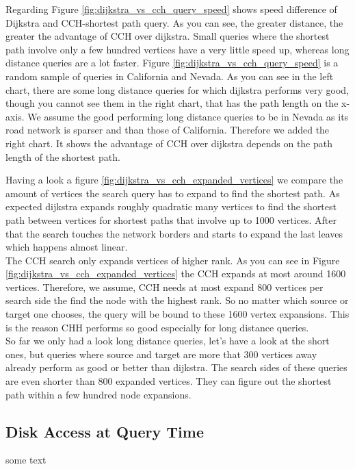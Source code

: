 Regarding Figure \ref{fig:dijkstra_vs_cch_query_speed} shows speed difference of Dijkstra and CCH-shortest path query. As you can see, the greater distance, the greater the advantage of CCH over dijkstra. Small queries where the shortest path involve only a few hundred vertices have a very little speed up,
whereas long distance queries are a lot faster. Figure \ref{fig:dijkstra_vs_cch_query_speed} is a random sample of queries in California and Nevada. As you can
see in the left chart, there are some long distance queries for which dijkstra performs very good, though you cannot see them in the right chart, that has the path 
length on the x-axis. We assume the good performing long distance queries to be in Nevada as its road network is sparser and than those of California. Therefore we added the right chart.
It shows the advantage of CCH over dijkstra depends on the path length of the shortest path.



Having a look a figure \ref{fig:dijkstra_vs_cch_expanded_vertices} we compare the amount of vertices the search query has to expand to find the shortest path. As expected dijkstra expands roughly quadratic many vertices to find the shortest path between vertices for shortest paths that involve up to 1000 vertices.
After that the search touches the network borders and starts to expand the last leaves which happens almost linear.\\
The CCH search only expands vertices of higher rank. As you can see in Figure \ref{fig:dijkstra_vs_cch_expanded_vertices} the CCH expands at most around 1600 vertices. Therefore, we assume, CCH needs at most expand 800 vertices per search side the find the node with the highest rank. So no matter which source or target one chooses, the query will be bound to these 1600 vertex expansions.
This is the reason CHH performs so good especially for long distance queries.
\\
So far we only had a look long distance queries, let's have a look at the short ones, but queries where source and target are more that 300 vertices away already perform as good or better than dijkstra. The search sides of these queries are even shorter than 800 expanded vertices. They can figure out the shortest path within a few hundred node expansions.



\subsection{Disk Access at Query Time}

some text








